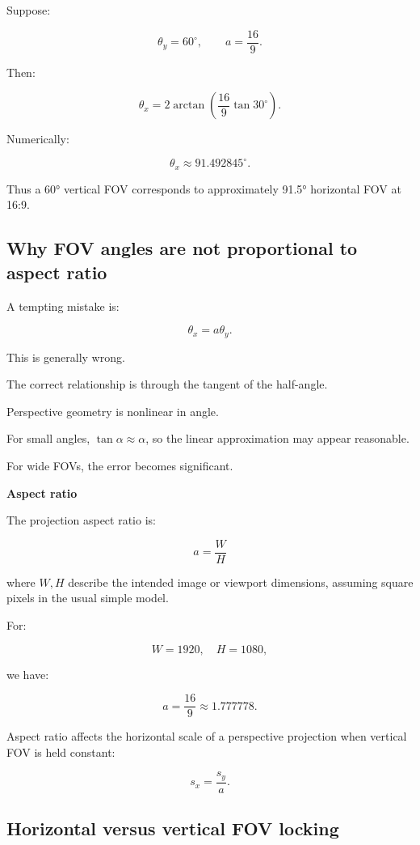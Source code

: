 Suppose:

\[
 \theta_y=60^\circ, \qquad a=\frac{16}{9}.
\]

Then:

\[
 \theta_x= 2\arctan \left( \frac{16}{9}\tan30^\circ \right).
\]

Numerically:

\[
 \boxed{ \theta_x\approx91.492845^\circ }.
\]

Thus a 60° vertical FOV corresponds to approximately 91.5° horizontal FOV at 16:9.

\subsection{Why FOV angles are not proportional to aspect ratio}\label{02-foundations-ii-ch033-why-fov-angles-are-not-proportional-to-aspect-ratio}

\hypertarget{02-foundations-ii-ch033-why-fov-angles-are-not-proportional-to-aspect-ratio}{}

A tempting mistake is:

\[
 \theta_x=a\theta_y.
\]

This is generally wrong.

The correct relationship is through the tangent of the half-angle.

Perspective geometry is nonlinear in angle.

For small angles, \(\tan\alpha\approx\alpha\), so the linear approximation may appear reasonable.

For wide FOVs, the error becomes significant.

\textbf{Aspect ratio}

The projection aspect ratio is:

\[
 \boxed{ a=\frac WH }
\]

where \(W,H\) describe the intended image or viewport dimensions, assuming square pixels in the usual simple model.

For:

\[
 W=1920,\quad H=1080,
\]

we have:

\[
 \boxed{ a=\frac{16}{9}\approx1.777778 }.
\]

Aspect ratio affects the horizontal scale of a perspective projection when vertical FOV is held constant:

\[
 s_x=\frac{s_y}{a}.
\]

\subsection{Horizontal versus vertical FOV locking}\label{02-foundations-ii-ch033-horizontal-versus-vertical-fov-locking}

